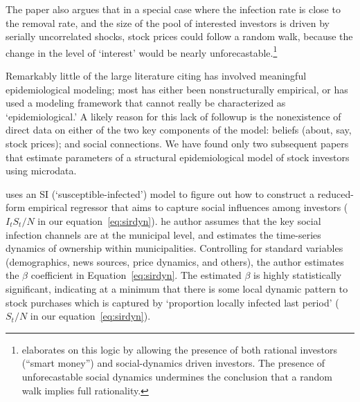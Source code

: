 The paper also argues that in a special case where the infection rate is close to the removal rate, and the size of the pool of interested investors is driven by serially uncorrelated shocks, stock prices could follow a random walk, because the change in the level of `interest' would be nearly unforecastable.\footnote{\cite{shiller1984stock} elaborates on this logic by allowing the presence of both rational investors (``smart money'') and social-dynamics driven investors. The presence of unforecastable social dynamics undermines the conclusion that a random walk implies full rationality.} %

Remarkably little of the large literature citing \cite{shiller1989survey} has involved meaningful epidemiological modeling; most has either been nonstructurally empirical, or has used a modeling framework that cannot really be characterized as `epidemiological.'
A likely reason for this lack of followup is the nonexistence of direct data on either of the two key components of the model: beliefs (about, say, stock prices); and social connections.  
We have found only two subsequent papers that estimate parameters of a structural epidemiological model of stock investors using microdata.

\href{https://github.com/iworld1991/EpiExp/blob/master/Literature/shive2010epidemic.pdf}{\cite{shive2010epidemic}} uses an SI (`susceptible-infected') model to figure out how to construct a reduced-form empirical regressor that aims to capture social influences among investors ($I_tS_t/N$ in our equation~\eqref{eq:sirdyn}). he author assumes that the key social infection channels are at the municipal level, and estimates the time-series dynamics of ownership within municipalities.  Controlling for standard variables (demographics, news sources, price dynamics, and others), the author estimates the $\beta$ coefficient in Equation~\eqref{eq:sirdyn}.  The estimated $\beta$ is highly statistically significant, indicating at a minimum that there is some local dynamic pattern to stock purchases which is captured by `proportion locally infected last period' ($S_t/N$ in our equation~\eqref{eq:sirdyn}).

